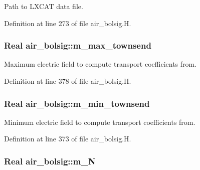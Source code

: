Path to L\+X\+C\+AT data file. 



Definition at line 273 of file air\+\_\+bolsig.\+H.

\subsubsection[{\texorpdfstring{m\+\_\+max\+\_\+townsend}{m_max_townsend}}]{\setlength{\rightskip}{0pt plus 5cm}Real air\+\_\+bolsig\+::m\+\_\+max\+\_\+townsend\hspace{0.3cm}{\ttfamily [protected]}}\hypertarget{classair__bolsig_a8a3ee4798568377c489b2e5b33c7f0ff}{}\label{classair__bolsig_a8a3ee4798568377c489b2e5b33c7f0ff}


Maximum electric field to compute transport coefficients from. 



Definition at line 378 of file air\+\_\+bolsig.\+H.

\subsubsection[{\texorpdfstring{m\+\_\+min\+\_\+townsend}{m_min_townsend}}]{\setlength{\rightskip}{0pt plus 5cm}Real air\+\_\+bolsig\+::m\+\_\+min\+\_\+townsend\hspace{0.3cm}{\ttfamily [protected]}}\hypertarget{classair__bolsig_a8ab953df21589ed6892d0fbbf2a0fda8}{}\label{classair__bolsig_a8ab953df21589ed6892d0fbbf2a0fda8}


Minimum electric field to compute transport coefficients from. 



Definition at line 373 of file air\+\_\+bolsig.\+H.

\subsubsection[{\texorpdfstring{m\+\_\+N}{m_N}}]{\setlength{\rightskip}{0pt plus 5cm}Real air\+\_\+bolsig\+::m\+\_\+N\hspace{0.3cm}{\ttfamily [protected]}}\hypertarget{classair__bolsig_a2d8bde5d91ec3e6693a3c569f634e102}{}\label{classair__bolsig_a2d8bde5d91ec3e6693a3c569f634e102}


